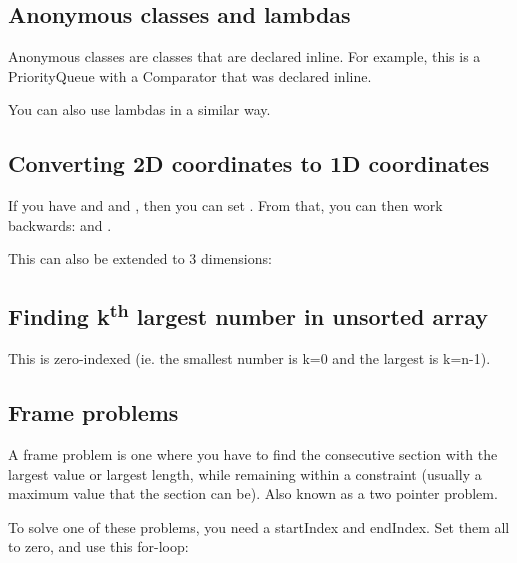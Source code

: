 
\subsection*{Anonymous classes and lambdas}

Anonymous classes are classes that are declared inline. For example, this is a PriorityQueue with a Comparator that was declared inline.



You can also use lambdas in a similar way.



\subsection*{Converting 2D coordinates to 1D coordinates}

If you have  and  and , then you can set . From that, you can then work backwards:  and .

This can also be extended to 3 dimensions: 

\subsection*{Finding k\textsuperscript{th} largest number in unsorted array}

This is zero-indexed (ie. the smallest number is k=0 and the largest is k=n-1).



\subsection*{Frame problems}

A frame problem is one where you have to find the consecutive section with the largest value or largest length, while remaining within a constraint (usually a maximum value that the section can be). Also known as a two pointer problem.

To solve one of these problems, you need a startIndex and endIndex. Set them all to zero, and use this for-loop: 

